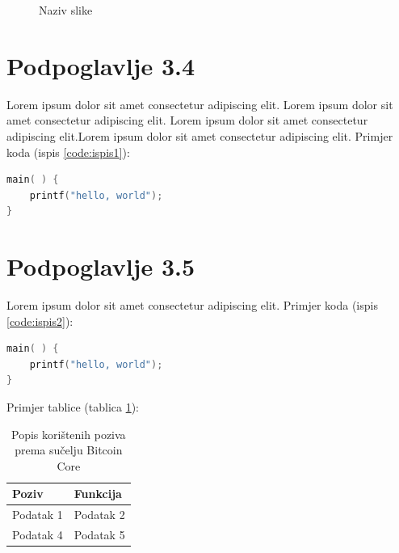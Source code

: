 \begin{figure}[H]
    \centering
    \caption{Naziv slike}
    \label{fig:slika3}
\end{figure}

\section{Podpoglavlje 3.4}
Lorem ipsum dolor sit amet consectetur adipiscing elit. Lorem ipsum dolor sit amet consectetur adipiscing elit. Lorem ipsum dolor sit amet consectetur adipiscing elit.Lorem ipsum dolor sit amet consectetur adipiscing elit.
Primjer koda (ispis \ref{code:ispis1}):

\begin{lstlisting}[language=C, caption={Naziv koda}, label={code:ispis1}]
main( ) {
    printf("hello, world");
}
\end{lstlisting}

\section{Podpoglavlje 3.5}
Lorem ipsum dolor sit amet consectetur adipiscing elit.
Primjer koda (ispis \ref{code:ispis2}):

\begin{lstlisting}[language=C, caption={Naziv koda}, label={code:ispis2}]
main( ) {
    printf("hello, world");
}
\end{lstlisting}

Primjer tablice (tablica \ref{tab:tablica1}):

\begin{table}[H]
    \centering
    \caption{Popis korištenih poziva prema sučelju Bitcoin Core}
    \label{tab:tablica1}
    \renewcommand{\arraystretch}{1.5} %
    \setlength{\tabcolsep}{5pt} %
    \begin{tabularx}{\textwidth}{|X|X|}
        \hline
        \textbf{Poziv} & \textbf{Funkcija} \\
        \hline
        Podatak 1 & Podatak 2 \\
        \hline
        Podatak 4 & Podatak 5 \\
        \hline
    \end{tabularx}
\end{table}

